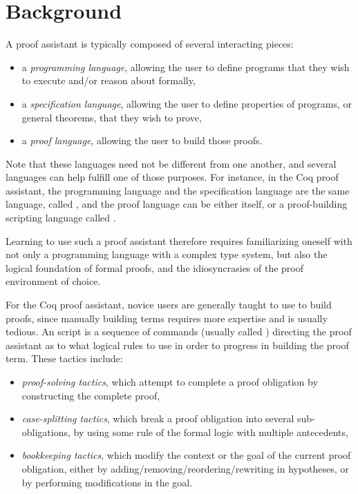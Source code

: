 \section{Background}

A proof assistant is typically composed of several interacting pieces:

\begin{itemize}

  \item a \emph{programming language}, allowing the user to define programs that
they wish to execute and/or reason about formally,

  \item a \emph{specification language}, allowing the user to define properties
of programs, or general theorems, that they wish to prove,

  \item a \emph{proof language}, allowing the user to build those proofs.

\end{itemize}

Note that these languages need not be different from one another, and several
languages can help fulfill one of those purposes.  For instance, in the Coq
proof assistant, the programming language and the specification language are the
same language, called \Gallina{}, and the proof language can be either
\Gallina{} itself, or a proof-building scripting language called \Ltac{}.

Learning to use such a proof assistant therefore requires familiarizing oneself
with not only a programming language with a complex type system, but also the
logical foundation of formal proofs, and the idiosyncrasies of the proof
environment of choice.

For the Coq proof assistant, novice users are generally taught to use \Ltac{} to
build proofs, since manually building \Gallina{} terms requires more expertise
and is usually tedious.  An \Ltac{} script is a sequence of commands (usually
called ) directing the proof assistant as to what logical rules
to use in order to progress in building the proof term.  These tactics include:

\begin{itemize}

  \item \emph{proof-solving tactics}, which attempt to complete a proof
obligation by constructing the complete proof,

  \item \emph{case-splitting tactics}, which break a proof obligation into
several sub-obligations, by using some rule of the formal logic with multiple
antecedents,

  \item \emph{bookkeeping tactics}, which modify the context or the goal of the
current proof obligation, either by adding/removing/reordering/rewriting in
hypotheses, or by performing modifications in the goal.

\end{itemize}

